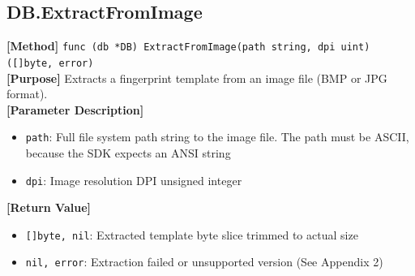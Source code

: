 \documentclass[11pt, a4paper]{article}
\begin{document}
\subsection{DB.ExtractFromImage}
\textbf{[Method]} \texttt{func (db *DB) ExtractFromImage(path string, dpi uint) ([]byte, error)} \\
\textbf{[Purpose]} Extracts a fingerprint template from an image file (BMP or JPG format). \\
\textbf{[Parameter Description]} 
\begin{itemize}
    \item \texttt{path}: Full file system path string to the image file. The path must be ASCII, because the SDK expects an ANSI string
    \item \texttt{dpi}: Image resolution DPI unsigned integer
\end{itemize}
\textbf{[Return Value]} 
\begin{itemize}
    \item \texttt{[]byte, nil}: Extracted template byte slice trimmed to actual size
    \item \texttt{nil, error}: Extraction failed or unsupported version (See Appendix 2)
\end{itemize}
\end{document}

